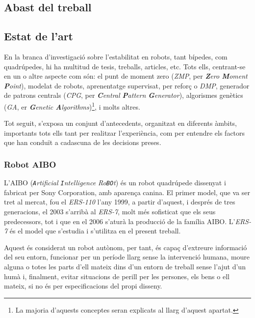 \documentclass[12pt,a4paper,final,twoside]{article}
\begin{document}
\subsection{Abast del treball}
\label{Abast}


\subsection{Estat de l'art}
\label{Estat-de-l'art}



En la branca d'investigació sobre l'estabilitat en robots, tant bípedes, com quadrúpedes, hi ha multitud de tesis, treballs, articles, etc. Tots ells, centrant-se en un o altre aspecte com són: el punt de moment zero (\textit{ZMP}, per \textit{\textbf{Z}ero \textbf{M}oment \textbf{P}oint}), modelat de robots, aprenentatge supervisat, per reforç o \textit{DMP}, generador de patrons centrals (\textit{CPG}, per \textit{\textbf{C}entral \textbf{P}attern \textbf{G}enerator}), algorismes genètics (\textit{GA}, er \textit{\textbf{G}enetic \textbf{A}lgorithms})\footnote{La majoria d'aquests conceptes seran explicats al llarg d'aquest apartat.}, i molts altres.

Tot seguit, s'exposa un conjunt d'antecedents, organitzat en diferents àmbits, importants tots ells tant per realitzar l'experiència, com per entendre els factors que han conduït a cadascuna de les decisions preses.


\subsubsection{Robot AIBO}
\label{AIBO}

L'AIBO (\textit{\texttt{A}rtificial \texttt{I}ntelligence Ro\texttt{BO}t}) és un robot quadrúpede dissenyat i fabricat per Sony Corporation, amb aparença canina. El primer model, que va ser tret al mercat, fou el \textit{ERS-110} l'any 1999, a partir d'aquest, i després de tres generacions, el 2003 s'arribà al \textit{ERS-7}, molt més sofisticat que els seus predecessors, tot i que en el 2006 s'aturà la producció de la família AIBO. L'\textit{ERS-7} és el model que s'estudia i s'utilitza en el present treball.

Aquest és considerat un robot autònom, per tant, és capaç d'extreure informació del seu entorn, funcionar per un període llarg sense la intervenció humana, moure alguna o totes les parts d'ell mateix dins d'un entorn de treball sense l'ajut d'un humà i, finalment, evitar situacions de perill per les persones, els bens o ell mateix, si no és per especificacions del propi disseny.
\end{document}
